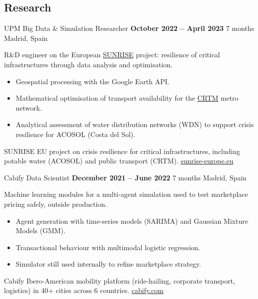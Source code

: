 \documentclass[10pt]{beamer}
\begin{document}
\subsection{Research}

\begin{frame}{UPM \textperiodcentered{} Big Data \& Simulation Researcher}
  \textbf{October 2022 -- April 2023} \hfill 7 months \textbullet{} Madrid, Spain

  R\&D engineer on the European \href{https://sunrise-europe.eu/}{SUNRISE}
  project: resilience of critical infrastructures through data analysis and
  optimisation.

  \begin{itemize}
    \item Geospatial processing with the Google Earth API.
    \item Mathematical optimisation of transport availability for the
          \href{https://www.crtm.es/}{CRTM} metro network.
    \item Analytical assessment of water distribution networks (WDN) to
          support crisis resilience for ACOSOL (Costa del Sol).
  \end{itemize}

  \begin{exampleblock}{SUNRISE}
    EU project on crisis resilience for critical infrastructures, including
    potable water (ACOSOL) and public transport (CRTM).
    \hfill \href{https://sunrise-europe.eu/}{sunrise-europe.eu}
  \end{exampleblock}
\end{frame}

\begin{frame}{Cabify \textperiodcentered{} Data Scientist}
  \textbf{December 2021 -- June 2022} \hfill 7 months \textbullet{} Madrid, Spain

  Machine learning modules for a multi-agent simulation used to test
  marketplace pricing safely, outside production.

  \begin{itemize}
    \item Agent generation with time-series models (\alert{SARIMA}) and
          Gaussian Mixture Models (\alert{GMM}).
    \item Transactional behaviour with multimodal logistic regression.
    \item Simulator still used internally to refine marketplace strategy.
  \end{itemize}

  \begin{exampleblock}{Cabify}
    Ibero-American mobility platform (ride-hailing, corporate transport,
    logistics) in 40+ cities across 6 countries.
    \hfill \href{https://cabify.com/en}{cabify.com}
  \end{exampleblock}
\end{frame}
\end{document}
